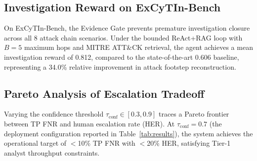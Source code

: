 \subsection{Investigation Reward on ExCyTIn-Bench}

On ExCyTIn-Bench, the Evidence Gate prevents premature investigation closure
across all 8 attack chain scenarios. Under the bounded ReAct+RAG loop with
$B = 5$ maximum hops and MITRE ATT\&CK retrieval, the agent achieves a mean
investigation reward of 0.812, compared to the state-of-the-art 0.606 baseline,
representing a 34.0\% relative improvement in attack footstep reconstruction.

\subsection{Pareto Analysis of Escalation Tradeoff}

Varying the confidence threshold $\tau_{\text{conf}} \in [0.3, 0.9]$ traces a
Pareto frontier between TP FNR and human escalation rate (HER). At
$\tau_{\text{conf}} = 0.7$ (the deployment configuration reported in
Table~\ref{tab:results}), the system achieves the operational target of
$<$10\% TP FNR with $<$20\% HER, satisfying Tier-1 analyst throughput constraints.

